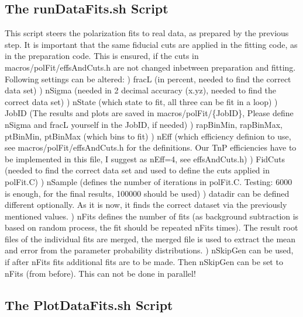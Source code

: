 \documentclass{article}
\begin{document}
\subsection{The runDataFits.sh Script}

This script steers the polarization fits to real data, as prepared by the previous step. It is important that the same fiducial cuts are applied in the fitting code, as in the preparation code. This is ensured, if the cuts in macros/polFit/effsAndCuts.h are not changed inbetween preparation and fitting. Following settings can be altered:
\newline *) fracL (in percent, needed to find the correct data set)
\newline *) nSigma (needed in 2 decimal accuracy (x.yz), needed to find the correct data set)
\newline *) nState (which state to fit, all three can be fit in a loop)
\newline *) JobID (The results and plots are saved in macros/polFit/\{JobID\}, Please define nSigma and fracL yourself in the JobID, if needed)
\newline *) rapBinMin, rapBinMax, ptBinMin, ptBinMax (which bins to fit)
\newline *) nEff (which efficiency definion to use, see macros/polFit/effsAndCuts.h for the definitions. Our TnP efficiencies have to be implemented in this file, I suggest as nEff=4, see effsAndCuts.h)
\newline *) FidCuts (needed to find the correct data set and used to define the cuts applied in polFit.C)
\newline *) nSample (defines the number of iterations in polFit.C. Testing: 6000 is enough, for the final results, 100000 should be used)
\newline *) datadir can be defined different optionally. As it is now, it finds the correct dataset via the previously mentioned values.
\newline *) nFits defines the number of fits (as background subtraction is based on random process, the fit should be repeated nFits times). The result root files of the individual fits are merged, the merged file is used to extract the mean and error from the parameter probability distributions.
\newline *) nSkipGen can be used, if after nFits fits additional fits are to be made. Then nSkipGen can be set to nFits (from before). This can not be done in parallel!


\subsection{The PlotDataFits.sh Script}
\end{document}
